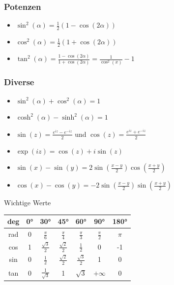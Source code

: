 \documentclass[a4paper,10pt]{article}
\begin{document}
\subsubsection{Potenzen}
\begin{itemize}
 \item $\sin^2(\alpha) = \frac{1}{2}(1-\cos(2\alpha))$
 \item $\cos^2(\alpha) = \frac{1}{2}(1+\cos(2\alpha))$
 \item $\tan^2(\alpha) = \frac{1-\cos(2\alpha)}{1+\cos(2\alpha)} = \frac{1}{\cos^2(x)} - 1$
\end{itemize}

\subsubsection{Diverse}

\begin{itemize}
 \item $\sin^2(\alpha) + \cos^2(\alpha) = 1$
 \item $\cosh^2(\alpha) - \sinh^2(\alpha) = 1$
 \item $\sin(z) = \frac{e^{iz} - e^{-iz}}{2}$ und $\cos(z) = \frac{e^{iz} + e^{-iz}}{2}$
 \item $\exp(iz) = \cos(z) + i\sin(z)$
 \item $\sin(x) - \sin(y) = 2\sin(\frac{x - y}{2})\cos(\frac{x + y}{2})$
 \item $\cos(x) - \cos(y) = -2\sin(\frac{x - y}{2})\sin(\frac{x + y}{2})$
\end{itemize}


\begin{mainbox}{Wichtige Werte}
\begin{center} 
 \begin{tabular}{c|cccccc}
  deg & 0° & 30° & 45° & 60° & 90° & 180° \\
  \midrule
  rad & 0 & $\frac{\pi}{6}$ & $\frac{\pi}{4}$ & $\frac{\pi}{3}$ & $\frac{\pi}{2}$ & $\pi$ \\
  cos & 1 & $\frac{\sqrt{3}}{2}$ & $\frac{\sqrt{2}}{2}$ & $\frac{1}{2}$ & 0 & -1 \\
  sin & 0 & $\frac{1}{2}$ & $\frac{\sqrt{2}}{2}$ & $\frac{\sqrt{3}}{2}$ & 1 & 0 \\
  tan & 0 & $\frac{1}{\sqrt{3}}$ & 1 & $\sqrt{3}$ & $+\infty$ & 0 \\
 \end{tabular}
\end{center}
\end{mainbox}
\end{document}
